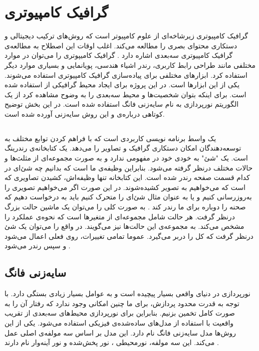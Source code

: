 \section{گرافیک کامپیوتری}

گرافیک کامپیوتری زیرشاخه‌ای از علوم کامپیوتر است که روش‌های 
ترکیب دیجیتالی و دستکاری محتوای بصری 
را مطالعه می‌کند.
اغلب اوقات این اصطلاح به مطالعه‌ی گرافیک 
کامپیوتری سه‌بعدی اشاره دارد \cite{ComputerGraphicsWikipedia}.
گرافیک کامیپوتری را می‌توان در 
موارد مختلفی مانند طراحی رابط کاربری،
رندر اشیاء هندسی، پویانمایی و بسیاری 
موارد دیگر استفاده کرد.
ابزارهای مختلفی برای پیاده‌سازی گرافیک کامپیوتری استفاده می‌شوند.
یکی از این ابزار‌ها 
است.
در این پروژه برای ایجاد محیط گرافیکی از 
استفاده شده است.
برای اینکه بتوان شخصیت‌ها و محیط سه‌بعدی را به وضوح مشاهده کرد از یک الگوریتم نورپردازی به نام 
سایه‌زنی فانگ استفاده شده است.
در این بخش توضیح کوتاهی دربا‌ره‌ی
 و
این روش سایه‌زنی آورده شده است.

\subsection {
    }

یک واسط برنامه نویسی کاربردی  
است که با فراهم کردن توابع مختلف به توسعه‌دهندگان امکان دستکاری گرافیک و تصاویر را می‌دهد.
یک کتابخانه‌ی رندرینگ است.
یک "شئ" به خودی خود در
مفهومی ندارد
و به صورت مجموعه‌ای از مثلث‌ها و حالات مختلف درنظر گرفته می‌شود. بنابراین  
وظیفه‌ی ما است که بدانیم چه شئ‌ای در کدام قسمت صفحه رندر شده است. این کتابخانه تنها وظیفه‌اش، کشیدن تصاویری که است که می‌خواهیم به تصویر کشیده‌شوند.
در این صورت اگر می‌خواهیم تصویری را به‌روزرسانی کنیم و یا به عنوان مثال شئ‌ای را متحرک کنیم باید به 
درخواست دهیم که صحنه را دوباره‌ برای ما رندر کند \cite{KhronosUsingOpenGL}.
به صورت کلی 
را می‌توان یک ماشین حالت بزرگ درنظر گرفت. هر حالت شامل مجموعه‌ای از متغیر‌ها است که نحوه‌ی عملکرد
را مشخص می‌کند. 
به مجموعه‌ی این حالت‌ها 
نیز می‌گویند. 
در واقع  
را می‌توان یک شئ درنظر گرفت که کل
را دربر می‌گیرد. عموما تمامی تغییرات، روی 
فعلی اعمال می‌شود و سپس رندر می‌شود \cite{KhronosUsingOpenGL} \cite{LearnOpenGL_GettingStarted}.


\subsection{سایه‌زنی فانگ}
\label{PhongShading}
نورپردازی در دنیای واقعی بسیار پیچیده است و
به عوامل بسیار زیادی بستگی دارد. با توجه به 
قدرت محدود پردازش، برای ما چنین امکانی وجود ندارد که رفتار آن را 
به صورت کامل تخمین بزنیم.
بنابراین برای نورپردازی محیط‌های سه‌بعدی از تقریب‌ واقعیت 
با استفاده از مدل‌های ساده‌شده‌ی فیزیکی استفاده می‌شود.
یکی از این روش‌ها مدل سایه‌زنی فانگ نام دارد.
این مدل بر اساس سه مولفه‌ی اصلی عمل می‌کند.
این سه ‌مولفه، نورمحیطی
، نور پخش‌شده
و نور آینه‌وار
نام دارند \cite{LearnOpenGLPhongShading}.

